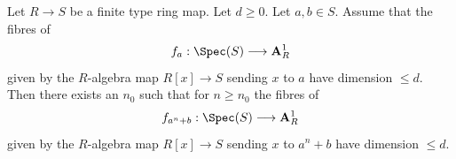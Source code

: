%
\begin{lemma}
\label{lemma-sum-is-ok}
Let $R \to S$ be a finite type ring map. Let $d \geq 0$. Let $a, b \in S$.
Assume that the fibres of
$$
f_a : \Spec(S) \longrightarrow \mathbf{A}^1_R
$$
given by the $R$-algebra map $R[x] \to S$ sending $x$ to $a$
have dimension $\leq d$. Then there exists an $n_0$ such that for
$n \geq n_0$ the fibres of
$$
f_{a^n + b} : \Spec(S) \longrightarrow \mathbf{A}^1_R
$$
given by the $R$-algebra map $R[x] \to S$ sending $x$ to $a^n + b$
have dimension $\leq d$.
\end{lemma}

